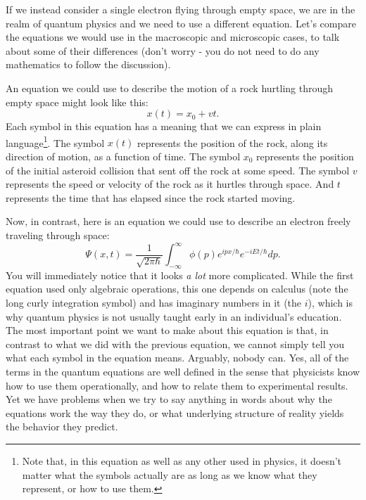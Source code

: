 \documentclass[onecolumn,preprintnumbers,amsmath,amssymbn,reprint,nofootinbib,superscriptaddress]{revtex4}    %
\begin{document}
If we instead consider a single electron flying through empty space, we are in the realm of quantum physics and we need to use a different equation.  Let's compare the equations we would use in the macroscopic and microscopic cases, to talk about some of their differences (don't worry - you do not need to do any mathematics to follow the discussion).  

An equation we could use to describe the motion of a rock hurtling through empty space might look like this:
\begin{equation}
x(t)=x_0+vt.
\end{equation}
Each symbol in this equation has a meaning that we can express in plain language\footnote{Note that, in this equation as well as any other used in physics, it doesn't matter what the symbols actually are as long as we know what they represent, or how to use them.}. The symbol $x(t)$ represents the position of the rock, along its direction of motion, as a function of time.  The symbol $x_0$ represents the position of the initial asteroid collision that sent off the rock at some speed.  The symbol $v$ represents the speed or velocity of the rock as it hurtles through space.  And $t$ represents the time that has elapsed since the rock started moving.  

Now, in contrast, here is an equation we could use to describe an electron freely traveling through space:
\begin{equation}
\Psi(x,t)=\frac{1}{\sqrt{2\pi\hbar}}\int^\infty_{-\infty}\phi(p)e^{ipx/\hbar}e^{-iEt/\hbar}dp.
\end{equation}
You will immediately notice that it looks {\em a lot} more complicated.  While the first equation used only algebraic operations, this one depends on calculus (note the long curly integration symbol) and has imaginary numbers in it (the $i$), which is why quantum physics is not usually taught early in an individual's education.  The most important point we want to make about this equation is that, in contrast to what we did with the previous equation, we cannot simply tell you what each symbol in the equation means.  Arguably, nobody can.  Yes, all of the terms in the quantum equations are well defined in the sense that physicists know how to use them operationally, and how to relate them to experimental results.  Yet we have problems when we try to say anything in words about why the equations work the way they do, or what underlying structure of reality yields the behavior they predict.
\end{document}

